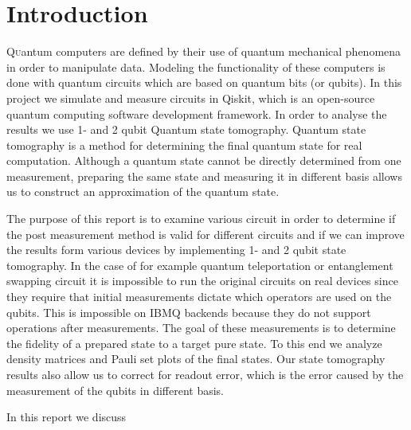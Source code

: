 \section{Introduction}

\lettrine[nindent=0em,lines=3]{Q}uantum computers are defined by their use of quantum mechanical phenomena in order to manipulate data. Modeling the functionality of these computers is done with quantum circuits which are based on quantum bits (or qubits). In this project we simulate and measure circuits in Qiskit, which is an open-source quantum computing software development framework. In order to analyse the results we use 1- and 2 qubit Quantum state tomography. Quantum state tomography is a method for determining the final quantum state for real computation. Although a quantum state cannot be directly determined from one measurement, preparing the same state and measuring it in different basis allows us to construct an approximation of the quantum state.

The purpose of this report is to examine various circuit in order to determine if the post measurement method is valid for different circuits and if we can improve the results form various devices by implementing 1- and 2 qubit state tomography. In the case of for example quantum teleportation or entanglement swapping circuit it is impossible to run the original circuits on real devices since they require that initial measurements dictate which operators are used on the qubits. This is impossible on IBMQ backends because they do not support operations after measurements. The goal of these measurements is to determine the fidelity of a prepared state to a target pure state. To this end we analyze density matrices and Pauli set plots of the final states. Our state tomography results also allow us to correct for readout error, which is the error caused by the measurement of the qubits in different basis.\cite{nielsen10_quant}

In this report we discuss
